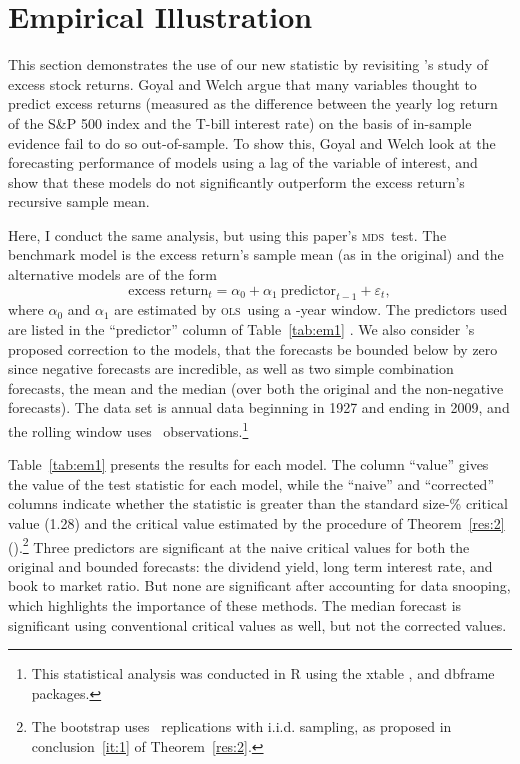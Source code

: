 \documentclass[11pt,fleqn]{article}
\newcommand\citepos[2][]{\citeauthor{#2}'s \citeyearpar[#1]{#2}}
\theoremstyle{definition}
\newcommand{\mds}{\textsc{mds}}
\newcommand{\ols}{\textsc{ols}}
\begin{document}
\section{Empirical Illustration}\label{sec:3}

This section demonstrates the use of our new statistic by revisiting
\citepos{GoW:08} study of excess stock returns.  Goyal and Welch argue
that many variables thought to predict excess returns (measured as the
difference between the yearly log return of the S\&P 500 index and the
T-bill interest rate) on the basis of in-sample evidence fail to do so
out-of-sample.  To show this, Goyal and Welch look at the forecasting
performance of models using a lag of the variable of interest, and
show that these models do not significantly outperform the excess
return's recursive sample mean.

Here, I conduct the same analysis, but using this paper's \mds\ test.
The benchmark model is the excess return's sample mean (as in the
original) and the alternative models are of the form
\[\text{excess return}_{t} = \alpha_{0} + \alpha_{1}\ 
\text{predictor}_{t-1} + \varepsilon_{t},\] where $\alpha_{0}$ and
$\alpha_{1}$ are estimated by \ols\ using a \windowlength-year window.
The predictors used are listed in the ``predictor'' column of
Table~\ref{tab:em1} \citep[see][for a detailed description of the
variables]{GoW:08}.  We also consider \citepos{CaT:08} proposed
correction to the models, that the forecasts be bounded below by zero
since negative forecasts are incredible, as well as two simple
combination forecasts, the mean and the median (over both the original
and the non-negative forecasts).  The data set is annual data
beginning in 1927 and ending in 2009, and the rolling window uses
\windowlength\ observations.\footnote{This statistical analysis was
  conducted in R \citep{R} using the xtable
  \citep[version~1.6-0]{Dah:09}, and dbframe \citep[version
  0.2.7]{Cal:10b} packages.}

Table~\ref{tab:em1} presents the results for each model.  The column
``value'' gives the value of the test statistic for each model, while
the ``naive'' and ``corrected'' columns indicate whether the statistic
is greater than the standard size-\bootsize\% critical value (1.28)
and the critical value estimated by the procedure of
Theorem~\ref{res:2} (\empiricalcriticalvalue).\footnote{The bootstrap
  uses \nboot\ replications with i.i.d. sampling, as proposed in
  conclusion~\ref{it:1} of Theorem~\ref{res:2}.}  Three predictors are
significant at the naive critical values for both the original and
bounded forecasts: the dividend yield, long term interest rate, and
book to market ratio.  But none are significant after accounting for
data snooping, which highlights the importance of these methods.  The
median forecast is significant using conventional critical values as
well, but not the corrected values.
\end{document}
